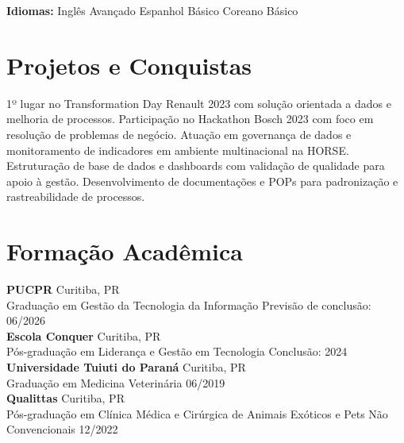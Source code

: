 \documentclass[11pt,a4paper]{article}
\begin{document}
\textbf{Idiomas:} Inglês Avançado \enspace\textbullet\enspace Espanhol Básico \enspace\textbullet\enspace Coreano Básico

\section{Projetos e Conquistas}

1º lugar no Transformation Day Renault 2023 com solução orientada a dados e melhoria de processos. Participação no Hackathon Bosch 2023 com foco em resolução de problemas de negócio. Atuação em governança de dados e monitoramento de indicadores em ambiente multinacional na HORSE. Estruturação de base de dados e dashboards com validação de qualidade para apoio à gestão. Desenvolvimento de documentações e POPs para padronização e rastreabilidade de processos.

\section{Formação Acadêmica}

\textbf{PUCPR} \hfill Curitiba, PR\\
Graduação em Gestão da Tecnologia da Informação \hfill Previsão de conclusão: 06/2026\\[6pt]

\textbf{Escola Conquer} \hfill Curitiba, PR\\
Pós-graduação em Liderança e Gestão em Tecnologia \hfill Conclusão: 2024\\[6pt]

\textbf{Universidade Tuiuti do Paraná} \hfill Curitiba, PR\\
Graduação em Medicina Veterinária \hfill 06/2019\\[6pt]

\textbf{Qualittas} \hfill Curitiba, PR\\
Pós-graduação em Clínica Médica e Cirúrgica de Animais Exóticos e Pets Não Convencionais \hfill 12/2022
\end{document}
